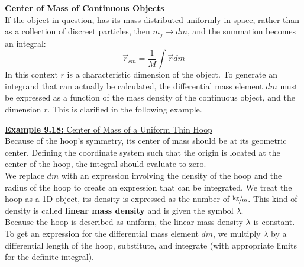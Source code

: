 \documentclass[a4paper]{article}
\let\bf\textbf
\begin{document}
\noindent\bf{Center of Mass of Continuous Objects}
\vspace{2mm}\\
If the object in question, has its mass distributed uniformly in space, rather than as a collection of discreet particles, then $m_j \to dm$, and the summation becomes an integral:
\begin{equation}
    \vec{r}_{cm} = \frac{1}{M}\int\vec{r}dm
\end{equation}
In this context $r$ is a characteristic dimension of the object. To generate an integrand that can actually be calculated, the differential mass element $dm$ must be expressed as a function of the mass density of the continuous object, and the dimension $r$. This is clarified in the following example.

\newpage
\begin{shaded}
    \underline{\bf{Example 9.18:} Center of Mass of a Uniform Thin Hoop}
    \vspace{2mm}\\
    Because of the hoop's symmetry, its center of mass should be at its geometric center. Defining the coordinate system such that the origin is located at the center of the hoop, the integral should evaluate to zero.
    \vspace{1mm}\\
    We replace $dm$ with an expression involving the density of the hoop and the radius of the hoop to create an expression that can be integrated. We treat the hoop as a 1D object, its density is expressed as the number of $\sfrac{\text{kg}}{\text{m}}$. This kind of density is called \bf{linear mass density} and is given the symbol $\lambda$.
    \vspace{1mm}\\
    Because the hoop is described as uniform, the linear mass density $\lambda$ is constant. To get an expression for the differential mass element $dm$, we multiply $\lambda$ by a differential length of the hoop, substitute, and integrate (with appropriate limits for the definite integral).
    \begin{center}
\end{center}
\end{shaded}
\end{document}
